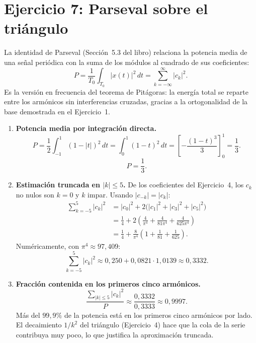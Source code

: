 \documentclass[10pt,a4paper]{article}
\begin{document}
	\section*{Ejercicio 7: Parseval sobre el triángulo}

	La identidad de Parseval (Sección~5.3 del libro) relaciona la potencia media de una señal periódica con la suma de los módulos al cuadrado de sus coeficientes:
	\[
		P = \frac{1}{T_0}\int_{T_0}|x(t)|^2\,dt = \sum_{k=-\infty}^{\infty}|c_k|^2.
	\]
	Es la versión en frecuencia del teorema de Pitágoras: la energía total se reparte entre los armónicos sin interferencias cruzadas, gracias a la ortogonalidad de la base demostrada en el Ejercicio~1.

	\begin{enumerate}[label=\textbf{\alph*)}]
		\item \textbf{Potencia media por integración directa.}
		\[
			P = \frac{1}{2}\int_{-1}^{1}(1 - |t|)^2\,dt = \int_{0}^{1}(1 - t)^2\,dt = \left[-\frac{(1-t)^3}{3}\right]_{0}^{1} = \frac{1}{3}.
		\]
		\[
			\boxed{P = \frac{1}{3}.}
		\]

		\item \textbf{Estimación truncada en $|k| \leq 5$.} De los coeficientes del Ejercicio~4, los $c_k$ no nulos son $k = 0$ y $k$ impar. Usando $|c_{-k}| = |c_k|$:
		\begin{align*}
			\sum_{k=-5}^{5}|c_k|^2 &= |c_0|^2 + 2\bigl(|c_1|^2 + |c_3|^2 + |c_5|^2\bigr) \\
			&= \frac{1}{4} + 2\left(\frac{4}{\pi^4} + \frac{4}{81\pi^4} + \frac{4}{625\pi^4}\right) \\
			&= \frac{1}{4} + \frac{8}{\pi^4}\left(1 + \frac{1}{81} + \frac{1}{625}\right).
		\end{align*}
		Numéricamente, con $\pi^4 \approx 97{,}409$:
		\[
			\sum_{k=-5}^{5}|c_k|^2 \approx 0{,}250 + 0{,}0821\cdot 1{,}0139 \approx 0{,}3332.
		\]

		\item \textbf{Fracción contenida en los primeros cinco armónicos.}
		\[
			\frac{\sum_{|k|\leq 5}|c_k|^2}{P} \approx \frac{0{,}3332}{0{,}3333} \approx 0{,}9997.
		\]
		Más del $99{,}9\%$ de la potencia está en los primeros cinco armónicos por lado. El decaimiento $1/k^2$ del triángulo (Ejercicio~4) hace que la cola de la serie contribuya muy poco, lo que justifica la aproximación truncada.
	\end{enumerate}

\end{document}
